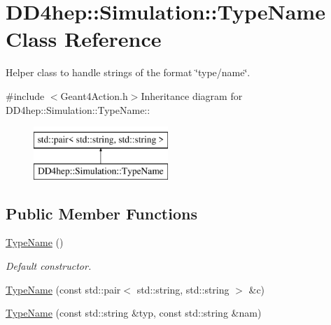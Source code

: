 \hypertarget{class_d_d4hep_1_1_simulation_1_1_type_name}{
\section{DD4hep::Simulation::TypeName Class Reference}
\label{class_d_d4hep_1_1_simulation_1_1_type_name}
}


Helper class to handle strings of the format \char`\"{}type/name\char`\"{}.  


{\ttfamily \#include $<$Geant4Action.h$>$}Inheritance diagram for DD4hep::Simulation::TypeName::\begin{figure}[H]
\begin{center}
\leavevmode
\includegraphics[height=2cm]{class_d_d4hep_1_1_simulation_1_1_type_name}
\end{center}
\end{figure}
\subsection*{Public Member Functions}
\begin{DoxyCompactItemize}
\item 
\hyperlink{class_d_d4hep_1_1_simulation_1_1_type_name_acd01167ff15a1321cad0d90772911865}{TypeName} ()
\begin{DoxyCompactList}\small\item\em Default constructor. \item\end{DoxyCompactList}\item 
\hyperlink{class_d_d4hep_1_1_simulation_1_1_type_name_ad33e6295683ae918b2ea2daad18b7917}{TypeName} (const std::pair$<$ std::string, std::string $>$ \&c)
\item 
\hyperlink{class_d_d4hep_1_1_simulation_1_1_type_name_a2d20b1a7a7d29a660d2fb3a7f471a78d}{TypeName} (const std::string \&typ, const std::string \&nam)
\end{DoxyCompactItemize}
